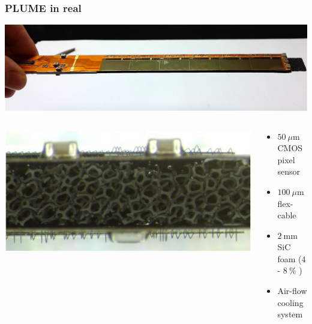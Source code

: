 \documentclass{beamer}
\begin{document}

\begin{frame}
  \frametitle{PLUME in real}

  \begin{center}
    \includegraphics[width = \textwidth]{Pictures/plume2.jpg}
  \end{center}
  
  \begin{columns}[c]
    \begin{column}{0.5\textwidth}
      \centering
      \includegraphics[width = \textwidth]{Pictures/SiC.png}
    \end{column}
    \begin{column}{0.5\textwidth}
      \begin{itemize}
        \item $50~\mu\text{m}$ CMOS pixel sensor
        \item $100~\mu\text{m}$ flex-cable
        \item $2~\text{mm}$ SiC foam ($4$ - $8~\%$ )
        \item Air-flow cooling system
      \end{itemize}
    \end{column}
  \end{columns}
\end{frame}

\end{document}
